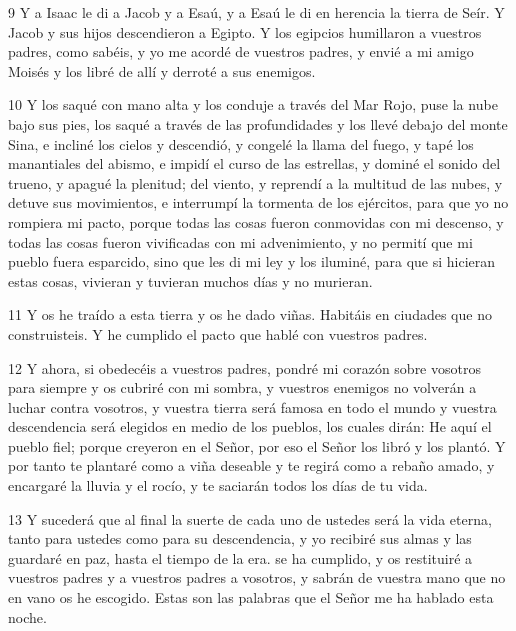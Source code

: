 \par 9 Y a Isaac le di a Jacob y a Esaú, y a Esaú le di en herencia la tierra de Seír. Y Jacob y sus hijos descendieron a Egipto. Y los egipcios humillaron a vuestros padres, como sabéis, y yo me acordé de vuestros padres, y envié a mi amigo Moisés y los libré de allí y derroté a sus enemigos.

\par 10 Y los saqué con mano alta y los conduje a través del Mar Rojo, puse la nube bajo sus pies, los saqué a través de las profundidades y los llevé debajo del monte Sina, e incliné los cielos y descendió, y congelé la llama del fuego, y tapé los manantiales del abismo, e impidí el curso de las estrellas, y dominé el sonido del trueno, y apagué la plenitud; del viento, y reprendí a la multitud de las nubes, y detuve sus movimientos, e interrumpí la tormenta de los ejércitos, para que yo no rompiera mi pacto, porque todas las cosas fueron conmovidas con mi descenso, y todas las cosas fueron vivificadas con mi advenimiento, y no permití que mi pueblo fuera esparcido, sino que les di mi ley y los iluminé, para que si hicieran estas cosas, vivieran y tuvieran muchos días y no murieran.

\par 11 Y os he traído a esta tierra y os he dado viñas. Habitáis en ciudades que no construisteis. Y he cumplido el pacto que hablé con vuestros padres.

\par 12 Y ahora, si obedecéis a vuestros padres, pondré mi corazón sobre vosotros para siempre y os cubriré con mi sombra, y vuestros enemigos no volverán a luchar contra vosotros, y vuestra tierra será famosa en todo el mundo y vuestra descendencia será elegidos en medio de los pueblos, los cuales dirán: He aquí el pueblo fiel; porque creyeron en el Señor, por eso el Señor los libró y los plantó. Y por tanto te plantaré como a viña deseable y te regirá como a rebaño amado, y encargaré la lluvia y el rocío, y te saciarán todos los días de tu vida.

\par 13 Y sucederá que al final la suerte de cada uno de ustedes será la vida eterna, tanto para ustedes como para su descendencia, y yo recibiré sus almas y las guardaré en paz, hasta el tiempo de la era. se ha cumplido, y os restituiré a vuestros padres y a vuestros padres a vosotros, y sabrán de vuestra mano que no en vano os he escogido. Estas son las palabras que el Señor me ha hablado esta noche.

